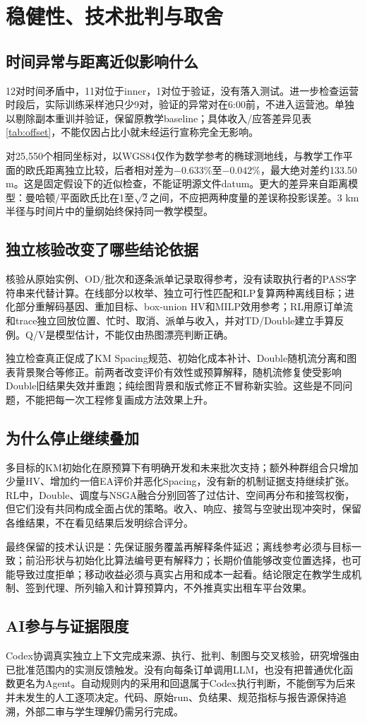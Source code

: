 \section{稳健性、技术批判与取舍}
\subsection{时间异常与距离近似影响什么}
12对时间矛盾中，11对位于inner，1对位于验证，没有落入测试。进一步检查运营时段后，实际训练采样池只少9对，验证的异常对在6:00前，不进入运营池。单独以剔除副本重训并验证，保留原教学baseline；具体收入/应答差异见表\ref{tab:offset}，不能仅因占比小就未经运行宣称完全无影响。


对25,550个相同坐标对，以WGS84仅作为数学参考的椭球测地线，与教学工作平面的欧氏距离独立比较，后者相对差为$-0.633\%$至$-0.042\%$，最大绝对差约133.50 m。这是固定假设下的近似检查，不能证明源文件datum。更大的差异来自距离模型：曼哈顿/平面欧氏比在1至$\sqrt2$之间，不应把两种度量的差误称投影误差。3 km半径与时间片中的量纲始终保持同一教学模型。

\subsection{独立核验改变了哪些结论依据}
核验从原始实例、OD/批次和逐条派单记录取得参考，没有读取执行者的PASS字符串来代替计算。在线部分以枚举、独立可行性匹配和LP复算两种离线目标；进化部分重解码基因、重加目标、box-union HV和MILP效用参考；RL用原订单流和trace独立回放位置、忙时、取消、派单与收入，并对TD/Double建立手算反例。Q/V是模型估计，不能仅由热图漂亮判断正确。

独立检查真正促成了KM Spacing规范、初始化成本补计、Double随机流分离和图表背景聚合等修正。前两者改变评价有效性或预算解释，随机流修复使受影响Double旧结果失效并重跑；纯绘图背景和版式修正不冒称新实验。这些是不同问题，不能把每一次工程修复画成方法效果上升。

\subsection{为什么停止继续叠加}
多目标的KM初始化在原预算下有明确开发和未来批次支持；额外种群组合只增加少量HV、增加约一倍EA评价并恶化Spacing，没有新的机制证据支持继续扩张。RL中，Double、调度与NSGA融合分别回答了过估计、空间再分布和接驾权衡，但它们没有共同构成全面占优的策略。收入、响应、接驾与空驶出现冲突时，保留各维结果，不在看见结果后发明综合评分。

最终保留的技术认识是：先保证服务覆盖再解释条件延迟；离线参考必须与目标一致；前沿形状与初始化比算法编号更有解释力；长期价值能够改变位置选择，也可能导致过度拒单；移动收益必须与真实占用和成本一起看。结论限定在教学生成机制、签到代理、所列输入和计算预算内，不外推真实出租车平台效果。

\subsection{AI参与与证据限度}
Codex协调真实独立上下文完成来源、执行、批判、制图与交叉核验，研究增强由已批准范围内的实测反馈触发。没有向每条订单调用LLM，也没有把普通优化函数更名为Agent。自动规则内的采用和回退属于Codex执行判断，不能倒写为后来并未发生的人工逐项决定。代码、原始run、负结果、规范指标与报告源保持追溯，外部二审与学生理解仍需另行完成。
